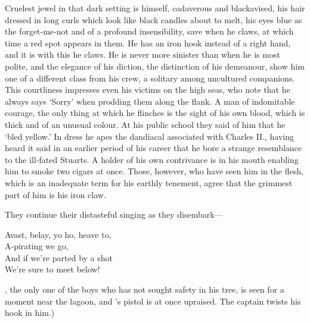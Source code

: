 \begin{stagedir}
Cruelest jewel in that dark setting is \hook himself, cadaverous and blackavised,
his hair dressed in long curls which look like black candles about to melt,
his eyes blue as the forget‐me‐not and of a profound insensibility,
save when he claws, at which time a red spot appears in them.
He has an iron hook instead of a right hand, and it is with this he claws.
He is never more sinister than when he is most polite,
and the elegance of his diction, the distinction of his demeanour,
show him one of a different class from his crew, a solitary among uncultured companions.
This courtliness impresses even his victims on the high seas,
who note that he always says ‘Sorry’ when prodding them along the flank.
A man of indomitable courage,
the only thing at which he flinches is the sight of his own blood, which is thick and of an unusual colour.
At his public school they said of him that he ‘bled yellow.’
In dress he apes the dandiacal associated with Charles II.,
having heard it said in an earlier period of his career that he bore a strange resemblance to the ill‐fated Stuarts.
A holder of his own contrivance is in his mouth enabling him to smoke two cigars at once.
Those, however, who have seen him in the flesh, which is an inadequate term for his earthly tenement,
agree that the grimmest part of him is his iron claw.

They continue their distasteful singing as they disembark—

\begin{drama}
\speakercontinues
	Avast, belay, yo ho, heave to,\\
	A‐pirating we go,\\
	And if we’re parted by a shot\\
	We’re sure to meet below!
\end{drama}

\nibs, the only one of the boys who has not sought safety in his tree, is seen for a moment near the lagoon,
and \starkey’s pistol is at once upraised.
The captain twists his hook in him.)
\end{stagedir}


